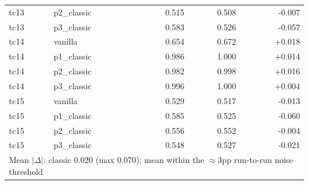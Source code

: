 \begin{longtable}{llrrr}
tc13 & p2\_classic & 0.515 & 0.508 & -0.007 \\
tc13 & p3\_classic & 0.583 & 0.526 & -0.057 \\
tc14 & vanilla & 0.654 & 0.672 & +0.018 \\
tc14 & p1\_classic & 0.986 & 1.000 & +0.014 \\
tc14 & p2\_classic & 0.982 & 0.998 & +0.016 \\
tc14 & p3\_classic & 0.996 & 1.000 & +0.004 \\
tc15 & vanilla & 0.529 & 0.517 & -0.013 \\
tc15 & p1\_classic & 0.585 & 0.525 & -0.060 \\
tc15 & p2\_classic & 0.556 & 0.552 & -0.004 \\
tc15 & p3\_classic & 0.548 & 0.527 & -0.021 \\
\midrule
\multicolumn{5}{l}{\small Mean $|\Delta|$: classic 0.020 (max 0.070); mean within the ${\approx}3$pp run-to-run noise threshold} \\
\bottomrule
\end{longtable}
